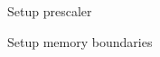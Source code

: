 \begin{DoxyItemize}
\item Setup prescaler ~\newline
~\newline
~\newline
~\newline
~\newline
~\newline
~\newline
~\newline
~\newline
~\newline
~\newline
~\newline
~\newline
~\newline
~\newline
~\newline
~\newline
~\newline
~\newline
~\newline
~\newline

\item Setup memory boundaries ~\newline
~\newline
~\newline
~\newline
~\newline
~\newline
~\newline
~\newline
~\newline
~\newline
~\newline
~\newline
~\newline
~\newline
~\newline
~\newline
~\newline
~\newline
~\newline
~\newline


\end{DoxyItemize}
